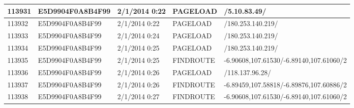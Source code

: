 \begin{longtable}{|p{1cm}|l|l|l|p{8cm}|}
113931         & E5D9904F0A8B4F99 & 2/1/2014 0:22            & PAGELOAD        & /5.10.83.49/                                                                                                                                                                                                          \\ \hline
113932         & E5D9904F0A8B4F99 & 2/1/2014 0:22            & PAGELOAD        & /180.253.140.219/                                                                                                                                                                                                     \\ \hline
113933         & E5D9904F0A8B4F99 & 2/1/2014 0:24            & PAGELOAD        & /180.253.140.219/                                                                                                                                                                                                     \\ \hline
113934         & E5D9904F0A8B4F99 & 2/1/2014 0:25            & PAGELOAD        & /180.253.140.219/                                                                                                                                                                                                     \\ \hline
113935         & E5D9904F0A8B4F99 & 2/1/2014 0:25            & FINDROUTE       & -6.90608,107.61530/-6.89140,107.61060/2                                                                                                                                                                               \\ \hline
113936         & E5D9904F0A8B4F99 & 2/1/2014 0:26            & PAGELOAD        & /118.137.96.28/                                                                                                                                                                                                       \\ \hline
113937         & E5D9904F0A8B4F99 & 2/1/2014 0:26            & FINDROUTE       & -6.89459,107.58818/-6.89876,107.60886/2                                                                                                                                                                               \\ \hline
113938         & E5D9904F0A8B4F99 & 2/1/2014 0:27            & FINDROUTE       & -6.90608,107.61530/-6.89140,107.61060/2                                                                                                                                                                               \\ \hline

\end{longtable}
